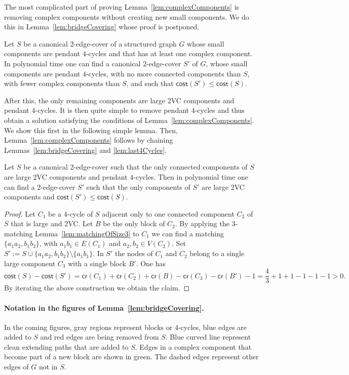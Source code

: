 \documentclass{article}
\newcommand{\cost}{\mathsf{cost}}
\newcommand{\credit}{\mathsf{cr}}
\begin{document}
The most complicated part of proving Lemma~\ref{lem:complexComponents} is removing complex components without creating new small components. We do this in Lemma~\ref{lem:bridgeCovering} whose proof is postponed. 
\begin{lemma}\label{lem:bridgeCovering}
    Let $S$ be a canonical 2-edge-cover of a structured graph $G$ whose small components are pendant $4$-cycles and that has at least one complex component. In polynomial time one can find a canonical $2$-edge-cover $S'$ of $G$, whose small components are pendant $4$-cycles, with no more connected components than $S$, with fewer complex components than $S$, and such that $\cost(S')\leq \cost(S)$.
\end{lemma}
After this, the only remaining components are large 2VC components and pendant $4$-cycles. It is then quite simple to remove pendant $4$-cycles and thus obtain a solution satisfying the conditions of Lemma~\ref{lem:complexComponents}. We show this first in the following simple lemma. Then, Lemma~\ref{lem:complexComponents} follows by chaining Lemmas~\ref{lem:bridgeCovering} and \ref{lem:last4Cycles}.

\begin{lemma}\label{lem:last4Cycles}
    Let $S$ be a canonical 2-edge-cover such that the only connected components of $S$ are large 2VC components and pendant $4$-cycles. Then in polynomial time one can find a 2-edge-cover $S'$ such that the only components of $S'$ are large 2VC components and $\cost(S')\leq \cost(S)$.
\end{lemma}
\begin{proof}
    Let $C_1$ be a $4$-cycle of $S$ adjacent only to one connected component $C_2$ of $S$ that is large and 2VC. Let $B$ be the only block of $C_2$. By applying the 3-matching Lemma~\ref{lem:matchingOfSize3} to $C_1$ we can find a matching $\{a_1a_2, b_1b_2\}$, with $a_1b_1\in E(C_1)$ and $a_2,b_2\in V(C_2)$. Set $S':=S\cup\{a_1a_2, b_1b_2\}\setminus\{a_1b_1\}$. In $S'$ the nodes of $C_1$ and $C_2$ belong to a single large component $C_3$ with a single block $B'$. One has 
    $$
    \cost(S)-\cost(S')=\credit(C_1)+\credit(C_2)+\credit(B)-\credit(C_3)-\credit(B')-1=\frac43+1+1-1-1-1>0.   
    $$
    By iterating the above construction we obtain the claim.
\end{proof}

\paragraph{Notation in the figures of Lemma~\ref{lem:bridgeCovering}.} In the coming figures, gray regions represent blocks or $4$-cycles, blue edges are added to $S$ and red edges are being removed from $S$. Blue curved line represent clean extending paths that are added to $S$. Edges in a complex component that become part of a new block are shown in green. The dashed edges represent other edges of $G$ not in $S$.
\end{document}
